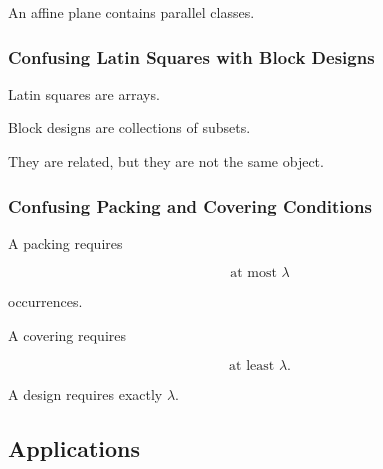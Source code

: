An affine plane contains parallel classes.

\subsubsection{Confusing Latin Squares with Block Designs}

Latin squares are arrays.

Block designs are collections of subsets.

They are related, but they are not the same object.

\subsubsection{Confusing Packing and Covering Conditions}

A packing requires

\[
\text{at most }\lambda
\]

occurrences.

A covering requires

\[
\text{at least }\lambda.
\]

A design requires exactly \(\lambda\).

\subsection{Applications}
\label{subsec:design-theory-applications}

